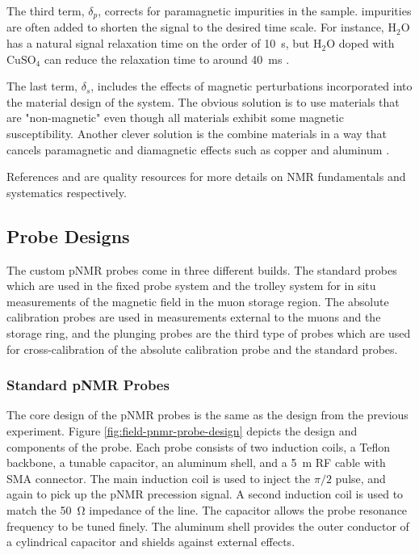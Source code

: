 The third term, $\delta_p$, corrects for paramagnetic impurities in the sample.  impurities are often added to shorten the signal to the desired time scale.  For instance, $\mathrm{H_2O}$ has a natural signal relaxation time on the order of \SI{10}{\second}, but $\mathrm{H_2O}$ doped with $\mathrm{CuSO_4}$ can reduce the relaxation time to around \SI{40}{\milli\second} \cite{e821-prd}.

The last term, $\delta_s$, includes the effects of magnetic perturbations incorporated into the material design of the system.  The obvious solution is to use materials that are "non-magnetic" even though all materials exhibit some magnetic susceptibility.  Another clever solution is the combine materials in a way that cancels paramagnetic and diamagnetic effects such as copper and aluminum \cite{schenk-med-nmr}.

References \cite{keeler-nmr} and \cite{schenk-med-nmr} are quality resources for more details on NMR fundamentals and systematics respectively.

\subsection{Probe Designs}

The custom pNMR probes come in three different builds.  The standard probes which are used in the fixed probe system and the trolley system for in situ measurements of the magnetic field in the muon storage region.  The absolute calibration probes are used in measurements external to the muons and the storage ring, and the plunging probes are the third type of probes which are used for cross-calibration of the absolute calibration probe and the standard probes.

\subsubsection{Standard pNMR Probes}

The core design of the pNMR probes is the same as the design from the previous experiment. Figure \ref{fig:field-pnmr-probe-design} depicts the design and components of the probe.  Each probe consists of two induction coils, a Teflon backbone, a tunable capacitor, an aluminum shell, and a \SI{5}{\meter} RF cable with SMA connector.  The main induction coil is used to inject the $\pi/2$ pulse, and again to pick up the pNMR precession signal.  A second induction coil is used to match the \SI{50}{\ohm} impedance of the line.  The capacitor allows the probe resonance frequency to be tuned finely.  The aluminum shell provides the outer conductor of a cylindrical capacitor and shields against external effects.

